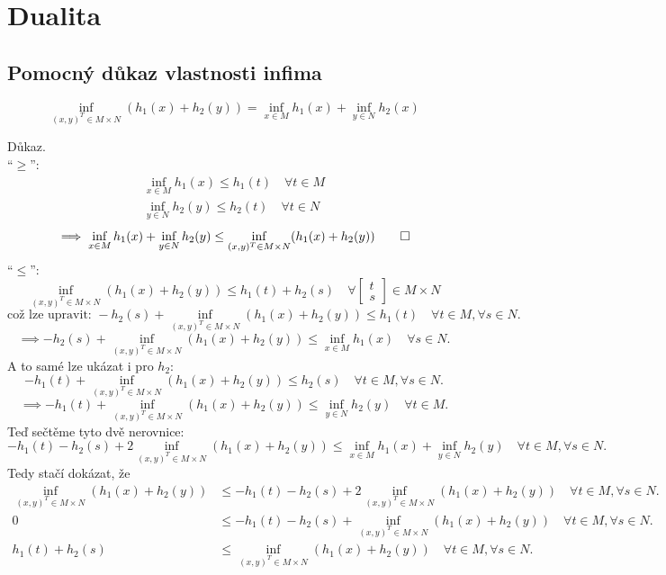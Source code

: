 \section{Dualita}

\subsection{Pomocný důkaz vlastnosti infima}\label{infPomoc}
\[
    \inf_{(x, y)^T \in M \times N} (h_1(x) + h_2(y)) = \inf_{x\in M}h_1(x) + \inf_{y\in N}h_2(x)
\]

Důkaz.\\
\enquote{$\geq$}:
\begin{align*}
    \inf_{x \in M} h_1(x) \leq h_1(t) \quad \forall t \in M \\
    \inf_{y \in N} h_2(y) \leq h_2(t) \quad \forall t \in N
\end{align*}
\[
    \implies \inf_{x\in M} h_1(x) + \inf_{y\in N}h_2(y) \leq \inf_{(x,y)^T \in M \times N}(h_1(x) + h_2(y)) \qed
\]
\enquote{$\leq$}:
\[
    \inf_{(x,y)^T \in M \times N}(h_1(x) + h_2(y)) \leq h_1(t) + h_2(s) \quad \forall 
    \begin{bmatrix}
        t \\
        s    
    \end{bmatrix} \in M \times N
\]
\[
    \text{což lze upravit: } -h_2(s) + \inf_{(x, y)^T \in M \times N}(h_1(x) + h_2(y)) \leq h_1(t) \quad \forall t\in M, 
    \forall s\in N.
\]
\[
    \implies -h_2(s) + \inf_{(x, y)^T \in M \times N}(h_1(x) + h_2(y)) \leq \inf_{x\in M} h_1(x) \quad \forall s\in N.
\]
A to samé lze ukázat i pro $h_2$:
\[
    -h_1(t) + \inf_{(x, y)^T \in M \times N}(h_1(x) + h_2(y)) \leq h_2(s) \quad \forall t\in M, \forall s\in N.
\]
\[
    \implies -h_1(t) + \inf_{(x, y)^T \in M \times N}(h_1(x) + h_2(y)) \leq \inf_{y\in N} h_2(y) \quad \forall t\in M.
\]
Teď sečtěme tyto dvě nerovnice:
\[
    -h_1(t) - h_2(s) + 2 \inf_{(x, y)^T \in M \times N}(h_1(x) + h_2(y)) \leq \inf_{x\in M} h_1(x) + \inf_{y\in N} h_2(y)
    \quad \forall t\in M, \forall s\in N.
\]
Tedy stačí dokázat, že
\begin{align*}
    \inf_{(x,y)^T \in M \times N}(h_1(x) + h_2(y)) &\leq -h_1(t) - h_2(s) + 2 \inf_{(x, y)^T \in M \times N}(h_1(x) + h_2(y)) 
    \quad \forall t\in M, \forall s\in N.\\
    0 &\leq -h_1(t) - h_2(s) + \inf_{(x, y)^T \in M \times N}(h_1(x) + h_2(y)) \quad \forall t\in M, \forall s\in N.\\
    h_1(t) + h_2(s) &\leq \inf_{(x, y)^T \in M \times N}(h_1(x) + h_2(y)) \quad \forall t\in M, \forall s\in N.
\end{align*}

